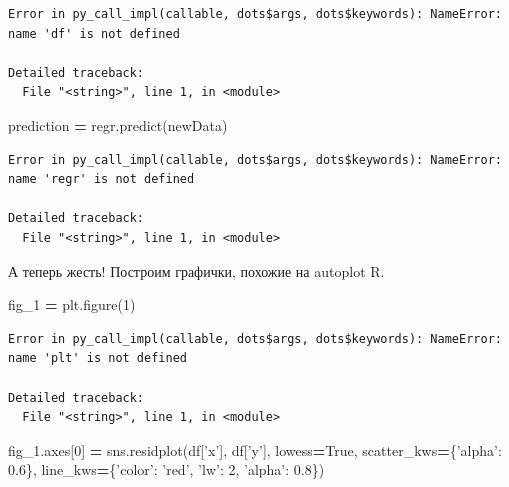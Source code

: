 \documentclass[]{book}
\newenvironment{Shaded}{\begin{snugshade}}{\end{snugshade}}
\newcommand{\DecValTok}[1]{\textcolor[rgb]{0.00,0.00,0.81}{#1}}
\newcommand{\FloatTok}[1]{\textcolor[rgb]{0.00,0.00,0.81}{#1}}
\newcommand{\NormalTok}[1]{#1}
\newcommand{\OperatorTok}[1]{\textcolor[rgb]{0.81,0.36,0.00}{\textbf{#1}}}
\newcommand{\StringTok}[1]{\textcolor[rgb]{0.31,0.60,0.02}{#1}}
\newcommand{\VariableTok}[1]{\textcolor[rgb]{0.00,0.00,0.00}{#1}}
\begin{document}
\begin{verbatim}
Error in py_call_impl(callable, dots$args, dots$keywords): NameError: name 'df' is not defined

Detailed traceback: 
  File "<string>", line 1, in <module>
\end{verbatim}

\begin{Shaded}
\begin{Highlighting}[]
\NormalTok{prediction }\OperatorTok{=}\NormalTok{ regr.predict(newData)}
\end{Highlighting}
\end{Shaded}

\begin{verbatim}
Error in py_call_impl(callable, dots$args, dots$keywords): NameError: name 'regr' is not defined

Detailed traceback: 
  File "<string>", line 1, in <module>
\end{verbatim}

А теперь жесть! Построим графички, похожие на autoplot R.

\begin{Shaded}
\begin{Highlighting}[]
\NormalTok{fig_1 }\OperatorTok{=}\NormalTok{ plt.figure(}\DecValTok{1}\NormalTok{)}
\end{Highlighting}
\end{Shaded}

\begin{verbatim}
Error in py_call_impl(callable, dots$args, dots$keywords): NameError: name 'plt' is not defined

Detailed traceback: 
  File "<string>", line 1, in <module>
\end{verbatim}

\begin{Shaded}
\begin{Highlighting}[]
\NormalTok{fig_1.axes[}\DecValTok{0}\NormalTok{] }\OperatorTok{=}\NormalTok{ sns.residplot(df[}\StringTok{'x'}\NormalTok{], df[}\StringTok{'y'}\NormalTok{],}
\NormalTok{                                  lowess}\OperatorTok{=}\VariableTok{True}\NormalTok{,}
\NormalTok{                                  scatter_kws}\OperatorTok{=}\NormalTok{\{}\StringTok{'alpha'}\NormalTok{: }\FloatTok{0.6}\NormalTok{\},}
\NormalTok{                                  line_kws}\OperatorTok{=}\NormalTok{\{}\StringTok{'color'}\NormalTok{: }\StringTok{'red'}\NormalTok{, }\StringTok{'lw'}\NormalTok{: }\DecValTok{2}\NormalTok{, }\StringTok{'alpha'}\NormalTok{: }\FloatTok{0.8}\NormalTok{\})}
\end{Highlighting}
\end{Shaded}
\end{document}
